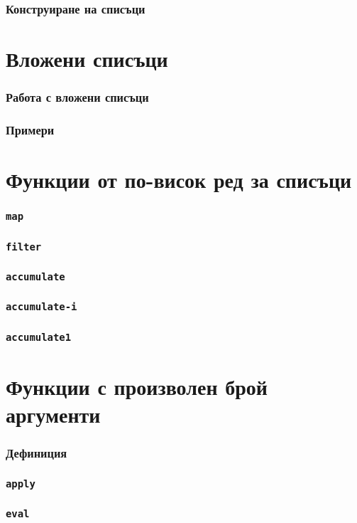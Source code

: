 \documentclass{beamer}
\begin{document}
\begin{frame}
  \frametitle{Конструиране на списъци}
\end{frame}

\section{Вложени списъци}

\begin{frame}
  \frametitle{Работа с вложени списъци}
\end{frame}

\begin{frame}
  \frametitle{Примери}
\end{frame}

\section{Функции от по-висок ред за списъци}

\begin{frame}
  \frametitle{\tt{map}}
\end{frame}

\begin{frame}
  \frametitle{\tt{filter}}
\end{frame}

\begin{frame}
  \frametitle{\tt{accumulate}}
\end{frame}

\begin{frame}
  \frametitle{\tt{accumulate-i}}
\end{frame}

\begin{frame}
  \frametitle{\tt{accumulate1}}
\end{frame}


\section{Функции с произволен брой аргументи}

\begin{frame}
  \frametitle{Дефиниция}
\end{frame}

\begin{frame}
  \frametitle{\tt{apply}}
\end{frame}

\begin{frame}
  \frametitle{\tt{eval}}
\end{frame}
\end{document}
